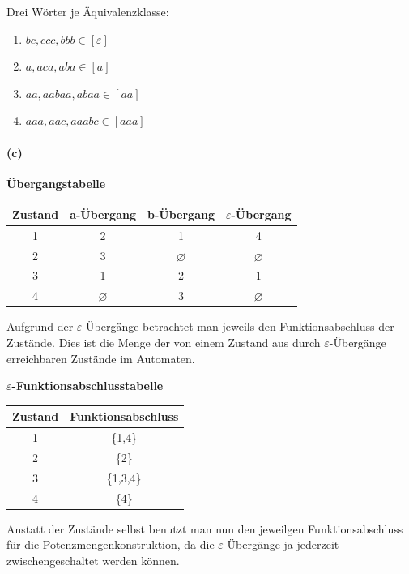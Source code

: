 	Drei Wörter je Äquivalenzklasse:
	\begin{enumerate}
		\item $bc, ccc, bbb \in [\varepsilon]$
		\item $a, aca, aba \in [a]$
		\item $aa, aabaa, abaa \in [aa]$
		\item $aaa, aac, aaabc \in [aaa]$
	\end{enumerate}
	\vspace{0.3cm}
	
\paragraph{(c)}
\textbf{Übergangstabelle}
	
	\begin{tabular}{|c|c|c|c|}
		\hline
		\textbf{Zustand}  & \textbf{a-Übergang} & \textbf{b-Übergang} & \textbf{$\varepsilon$-Übergang} \\
		\hline
		1                 & 2                   & 1                   & 4 \\
		\hline
		2                 & 3                   & $\varnothing$       & $\varnothing$ \\
		\hline
		3                 & 1                   & 2                   & 1 \\
		\hline
		4                 & $\varnothing$       & 3                   & $\varnothing$ \\
		\hline
	\end{tabular}
	
	Aufgrund der $\varepsilon$-Übergänge betrachtet man jeweils den Funktionsabschluss der Zustände. Dies ist die Menge der von einem Zustand aus durch $\varepsilon$-Übergänge erreichbaren Zustände im Automaten. 

	\textbf{$\varepsilon$-Funktionsabschlusstabelle}
		
	\begin{tabular}{|c|c|}
		\hline
		\textbf{Zustand}  & \textbf{Funktionsabschluss} \\
		\hline
		1                 & \{1,4\} \\
		\hline
		2                 & \{2\} \\
		\hline
		3                 & \{1,3,4\}  \\
		\hline
		4                 & \{4\} \\
		\hline
	\end{tabular}

	Anstatt der Zustände selbst benutzt man nun den jeweilgen Funktionsabschluss für die Potenzmengenkonstruktion, da die $\varepsilon$-Übergänge ja jederzeit zwischengeschaltet werden können.
	

